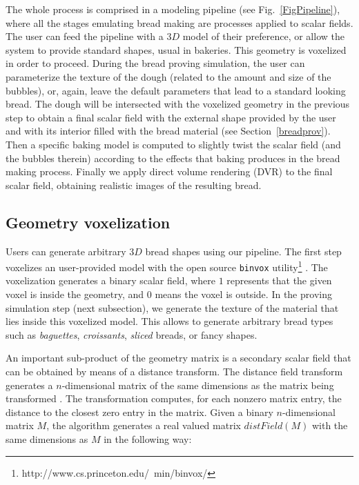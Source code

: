 \documentclass[spanish,a4paper,11pt,oneside,links]{report}
\begin{document}
The whole process is comprised in a modeling pipeline (see Fig.~\ref{FigPipeline}), where all the stages emulating bread making are processes applied to scalar fields.
The user can feed the pipeline with a $3D$ model of their preference, or allow the system to provide standard shapes, usual in bakeries.
This geometry is voxelized in order to proceed.
During the bread proving simulation, the user can parameterize the texture of the dough (related to the amount and size of the bubbles), or, again, leave the default parameters that lead to a standard looking bread.
The dough will be intersected with the voxelized geometry in the previous step to obtain a final scalar field with the external shape provided by the user and with its interior filled with the bread material (see Section~\ref{breadprov}). 
Then a specific baking model is computed  \cite{Powathil2004} to slightly twist the scalar field (and the bubbles therein) according to the effects that baking produces in the bread making process. 
Finally we apply direct volume rendering (DVR) \cite{Kruger2003} to the final scalar field, obtaining realistic images of the resulting bread.


\subsection{Geometry voxelization}

Users can generate arbitrary $3D$ bread shapes using our pipeline.
The first step voxelizes an user-provided model with the open source {\tt binvox} utility\footnote{http://www.cs.princeton.edu/~min/binvox/} \cite{Nooruddin2003}.
The voxelization generates a binary scalar field, where $1$ represents that the given voxel is inside the geometry, and $0$ means the voxel is outside.
In the proving simulation step (next subsection), we generate the texture of the material that lies inside this voxelized model.
This allows to generate arbitrary bread types such as {\em baguettes}, {\em croissants}, {\em sliced} breads, or fancy shapes.

An important sub-product of the geometry matrix is a secondary scalar field that can be obtained by means of a distance transform.
The distance field transform generates a $n$-dimensional matrix of the same dimensions as the matrix being transformed \cite{osh03}. 
The transformation computes, for each nonzero matrix entry, the distance to the closest zero entry in the matrix.
Given a binary $n$-dimensional matrix $M$, the algorithm generates a real valued matrix $distField(M)$ with the same dimensions as $M$ in the following way:
\end{document}
